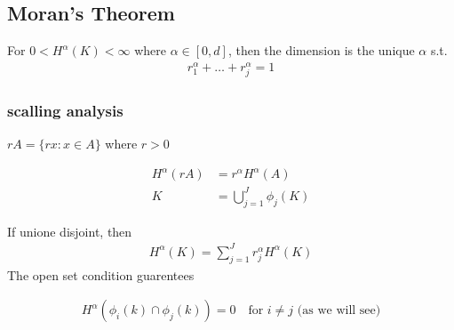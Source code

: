 \subsection{Moran's Theorem}

\begin{theorem}[Moran's 1946]

	For $0 < H^{\alpha} (K) < \infty$ where $\alpha \in [0,d]$, then the dimension is the unique $\alpha$ s.t.
	\begin{align*}
	r_{1}^{\alpha} + \ldots + r_{j}^{\alpha} = 1
	\end{align*} 
	
\end{theorem}


\subsubsection{scalling analysis}

$rA = \{rx : x \in A \}$ where  $r > 0$

 \begin{align*}
	 H^{\alpha} (rA) &= r^{\alpha} H^{\alpha} (A) \\
				K	&= \bigcup_{j=1}^{J} \phi_{j} (K)
\end{align*} 

If unione disjoint, then 
\begin{align*}
	H^{\alpha}(K) = \sum_{j=1}^{J} r_{j}^{\alpha} H^{\alpha} (K)
\end{align*} 
 The open set condition guarentees

 \begin{align*}
 	H^{\alpha} (\phi_{i} (k) \cap \phi_{j} (k) ) = 0 \quad \text{for $i \neq j$  (as we will see)}
 \end{align*} 

